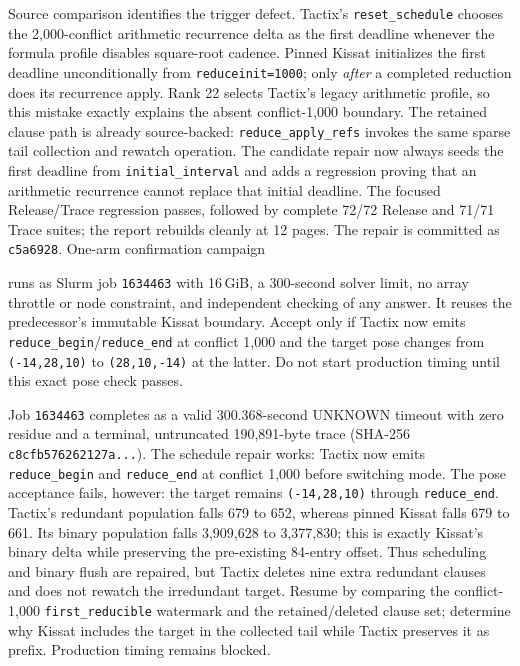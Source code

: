 \documentclass[11pt]{article}
\newcommand{\code}[1]{\texttt{#1}}
\newcommand{\artifact}[1]{\path{#1}}
\begin{document}
Source comparison identifies the trigger defect. Tactix's
\code{reset\_schedule} chooses the 2,000-conflict arithmetic recurrence delta
as the first deadline whenever the formula profile disables square-root
cadence. Pinned Kissat initializes the first deadline unconditionally from
\code{reduceinit=1000}; only \emph{after} a completed reduction does its
recurrence apply. Rank 22 selects Tactix's legacy arithmetic profile, so this
mistake exactly explains the absent conflict-1,000 boundary. The retained
clause path is already source-backed: \code{reduce\_apply\_refs} invokes the
same sparse tail collection and rewatch operation. The candidate repair now
always seeds the first deadline from \code{initial\_interval} and adds a
regression proving that an arithmetic recurrence cannot replace that initial
deadline. The focused Release/Trace regression passes, followed by complete
72/72 Release and 71/71 Trace suites; the report rebuilds cleanly at 12 pages.
The repair is committed as \code{c5a6928}. One-arm confirmation campaign
\begin{center}\small\artifact{20260819-0424-tierd-rank22-reduceinit1000}\end{center}
runs as Slurm job \code{1634463} with 16\,GiB, a 300-second solver limit, no
array throttle or node constraint, and independent checking of any answer. It
reuses the predecessor's immutable Kissat boundary. Accept only if Tactix now
emits \code{reduce\_begin}/\code{reduce\_end} at conflict 1,000 and the target
pose changes from \code{(-14,28,10)} to \code{(28,10,-14)} at the latter.
Do not start production timing until this exact pose check passes.

Job \code{1634463} completes as a valid 300.368-second UNKNOWN timeout with
zero residue and a terminal, untruncated 190,891-byte trace (SHA-256
\code{c8cfb576262127a...}). The schedule repair works: Tactix now emits
\code{reduce\_begin} and \code{reduce\_end} at conflict 1,000 before switching
mode. The pose acceptance fails, however: the target remains
\code{(-14,28,10)} through \code{reduce\_end}. Tactix's redundant population
falls 679 to 652, whereas pinned Kissat falls 679 to 661. Its binary population
falls 3,909,628 to 3,377,830; this is exactly Kissat's binary delta while
preserving the pre-existing 84-entry offset. Thus scheduling and binary flush
are repaired, but Tactix deletes nine extra redundant clauses and does not
rewatch the irredundant target. Resume by comparing the conflict-1,000
\code{first\_reducible} watermark and the retained/deleted clause set; determine
why Kissat includes the target in the collected tail while Tactix preserves it
as prefix. Production timing remains blocked.
\end{document}
